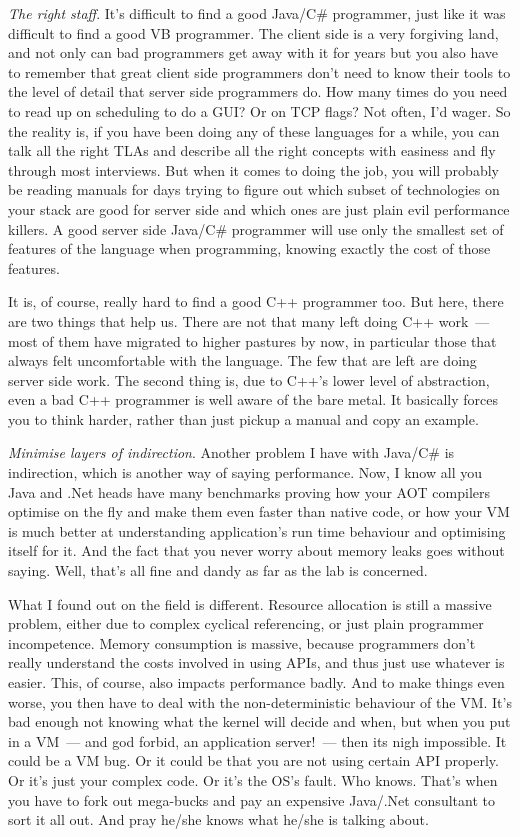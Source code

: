 \documentclass{memoir}
\begin{document}
\emph{The right staff}. It's difficult to find a good Java/C\#
programmer, just like it was difficult to find a good VB
programmer. The client side is a very forgiving land, and not only can
bad programmers get away with it for years but you also have to
remember that great client side programmers don't need to know their
tools to the level of detail that server side programmers do. How many
times do you need to read up on scheduling to do a GUI? Or on TCP
flags? Not often, I'd wager. So the reality is, if you have been doing
any of these languages for a while, you can talk all the right TLAs
and describe all the right concepts with easiness and fly through most
interviews. But when it comes to doing the job, you will probably be
reading manuals for days trying to figure out which subset of
technologies on your stack are good for server side and which ones are
just plain evil performance killers. A good server side Java/C\#
programmer will use only the smallest set of features of the language
when programming, knowing exactly the cost of those features.

It is, of course, really hard to find a good C++ programmer too. But
here, there are two things that help us. There are not that many left
doing C++ work~--- most of them have migrated to higher pastures by now,
in particular those that always felt uncomfortable with the
language. The few that are left are doing server side work. The second
thing is, due to C++'s lower level of abstraction, even a bad C++
programmer is well aware of the bare metal. It basically forces you to
think harder, rather than just pickup a manual and copy an example.

\emph{Minimise layers of indirection}. Another problem I have with
Java/C\# is indirection, which is another way of saying
performance. Now, I know all you Java and .Net heads have many
benchmarks proving how your AOT compilers optimise on the fly and make
them even faster than native code, or how your VM is much better at
understanding application's run time behaviour and optimising itself
for it. And the fact that you never worry about memory leaks goes
without saying. Well, that's all fine and dandy as far as the lab is
concerned.

What I found out on the field is different. Resource allocation is
still a massive problem, either due to complex cyclical referencing,
or just plain programmer incompetence. Memory consumption is massive,
because programmers don't really understand the costs involved in
using APIs, and thus just use whatever is easier. This, of course,
also impacts performance badly. And to make things even worse, you
then have to deal with the non-deterministic behaviour of the VM. It's
bad enough not knowing what the kernel will decide and when, but when
you put in a VM~--- and god forbid, an application server!~--- then its
nigh impossible. It could be a VM bug. Or it could be that you are not
using certain API properly. Or it's just your complex code. Or it's
the OS's fault. Who knows. That's when you have to fork out mega-bucks
and pay an expensive Java/.Net consultant to sort it all out. And pray
he/she knows what he/she is talking about.
\end{document}

